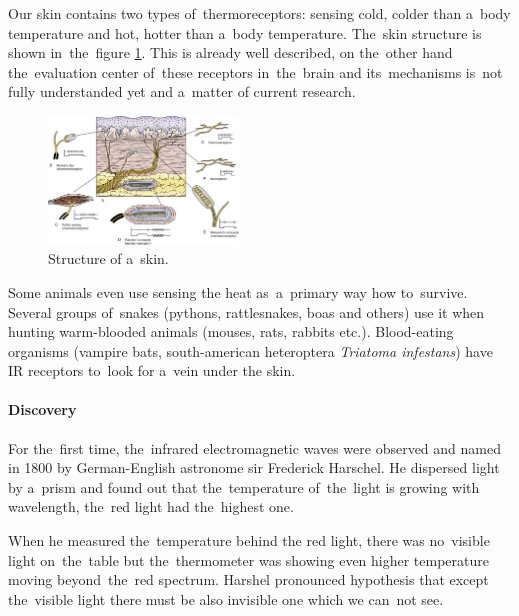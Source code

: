 Our skin contains two types of~thermoreceptors: sensing cold, colder than a~body temperature and
hot, hotter than a~body temperature. The~skin structure is shown in~the~figure \ref{fig:skin}.
This is already well described, on the~other hand the~evaluation center of~these receptors in~the~brain
and its~mechanisms is~not fully understanded yet and a~matter of current research. \cite{BodilySenses}

\begin{figure}[h!]
\begin{center}
\includegraphics[width=0.45\textwidth]{img/skin.jpg}
\caption{Structure of a~skin. \cite{SkinStructure}\label{fig:skin}}
\end{center}    
\end{figure}

Some animals even use sensing the heat as~a~primary way how to~survive. Several groups of~snakes
(pythons, rattlesnakes, boas and others) use it when hunting warm-blooded animals (mouses, rats, rabbits etc.).
Blood-eating organisms (vampire bats, south-american heteroptera {\it Triatoma infestans})
have IR receptors to~look for a~vein under the skin.\cite{SnakeInfrared}


\paragraph{Discovery}
For the~first time, the~infrared electromagnetic waves were observed and named in 1800 by German-English
astronome sir Frederick Harschel. He dispersed light by a~prism and found out that the~temperature
of~the~light is growing with wavelength, the~red light had the~highest one.

When he measured the~temperature behind the red light, there was no~visible light on~the~table but
the~thermometer was showing even higher temperature moving beyond~the~red spectrum. Harshel
pronounced hypothesis that except the~visible light there must be also invisible one which we can~not
see. \cite{HerschelLife}


